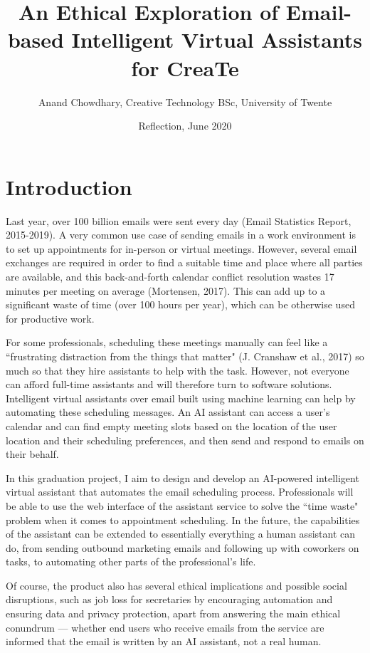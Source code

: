 \documentclass{article}
\title{An Ethical Exploration of Email-based Intelligent Virtual Assistants for CreaTe}
\date{Reflection, June 2020}
\author{Anand Chowdhary, Creative Technology BSc, University of Twente}
\begin{document}
  \maketitle
  \tableofcontents
  \newpage

\section{Introduction}

Last year, over 100 billion emails were sent every day (Email Statistics Report, 2015-2019). A very common use case of sending emails in a work environment is to set up appointments for in-person or virtual meetings. However, several email exchanges are required in order to find a suitable time and place where all parties are available, and this back-and-forth calendar conflict resolution wastes 17 minutes per meeting on average (Mortensen, 2017). This can add up to a significant waste of time (over 100 hours per year), which can be otherwise used for productive work.

For some professionals, scheduling these meetings manually can feel like a ``frustrating distraction from the things that matter" (J. Cranshaw et al., 2017) so much so that they hire assistants to help with the task. However, not everyone can afford full-time assistants and will therefore turn to software solutions. Intelligent virtual assistants over email built using machine learning can help by automating these scheduling messages. An AI assistant can access a user's calendar and can find empty meeting slots based on the location of the user location and their scheduling preferences, and then send and respond to emails on their behalf.

In this graduation project, I aim to design and develop an AI-powered intelligent virtual assistant that automates the email scheduling process. Professionals will be able to use the web interface of the assistant service to solve the ``time waste" problem when it comes to appointment scheduling. In the future, the capabilities of the assistant can be extended to essentially everything a human assistant can do, from sending outbound marketing emails and following up with coworkers on tasks, to automating other parts of the professional's life.

Of course, the product also has several ethical implications and possible social disruptions, such as job loss for secretaries by encouraging automation and ensuring data and privacy protection, apart from answering the main ethical conundrum — whether end users who receive emails from the service are informed that the email is written by an AI assistant, not a real human.
\end{document}
